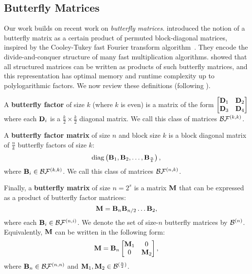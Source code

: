 \subsection{Butterfly Matrices}
\label{sec:butterfly}
Our work builds on recent work on \emph{butterfly matrices}. \citet{dao2019learning} introduced the notion of a {butterfly matrix} as a certain product of permuted block-diagonal matrices, inspired by the Cooley-Tukey fast Fourier transform algorithm~\citep{cooley1965algorithm}.
They encode the divide-and-conquer structure of many fast multiplication algorithms.
\citet{dao2020kaleidoscope} showed that all structured matrices can be written as products of such butterfly matrices, and this representation has optimal memory and runtime complexity up to polylogarithmic factors. We now review these definitions (following \citep{dao2020kaleidoscope}).

    A \textbf{butterfly factor} of size $k$ (where $k$ is even) is a matrix of the form
    \(
        \begin{bmatrix}
            \mathbf{D}_1 & \mathbf{D}_2 \\ \mathbf{D}_3 & \mathbf{D}_4
        \end{bmatrix}
    \)
    where each $\mathbf{D}_i$ is a $\frac{k}{2} \times \frac{k}{2}$ diagonal matrix. We call this class of matrices $\mathcal{B}\mathcal{F}^{(k,k)}$.

 A \textbf{butterfly factor matrix} of size $n$ and block size $k$ is a block diagonal matrix of $\frac{n}{k}$ butterfly factors of size $k$:
     \[
        \mathrm{diag}\left(\mathbf{B}_1, \mathbf{B}_2, \hdots, \mathbf{B}_\frac{n}{k} \right),
     \]
      where $\mathbf{B}_i \in \mathcal{B}\mathcal{F}^{(k,k)}$. We call this class of matrices $\mathcal{B}\mathcal{F}^{(n,k)}$.

    Finally, a \textbf{butterfly matrix} of size $n = 2^s$ is a matrix $\mathbf{M}$ that can be expressed as a product of butterfly factor matrices:
    \[
        \mathbf{M} = \mathbf{B}_n \mathbf{B}_{n/2} \hdots \mathbf{B}_2,
    \]
    where each $\mathbf{B}_i \in \mathcal{B}\mathcal{F}^{(n, i)}$. We denote the set of size-$n$ butterfly matrices by $\mathcal{B}^{(n)}$.
    Equivalently, $\mathbf{M}$ can be written in the following form:
    \[
         \mathbf{M} = \mathbf{B}_n \begin{bmatrix}
            \mathbf{M}_1 & 0 \\
            0 & \mathbf{M}_2
         \end{bmatrix},
    \]
    where $\mathbf{B}_n \in \mathcal{B}\mathcal{F}^{(n,n)}$ and $\mathbf{M}_1, \mathbf{M}_2 \in \mathcal{B}^{(\frac{n}{2})}$.

